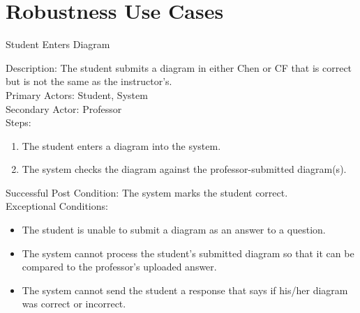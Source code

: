 \chapter{Robustness Use Cases}
    \begin{section}{Student Enters Diagram}
     
    Description: The student submits a diagram in either Chen or CF that is correct but is not the same as the instructor’s.\\
    Primary Actors: Student, System\\
    Secondary Actor: Professor\\
    Steps:
    \begin{enumerate}
    \item The student enters a diagram into the system.
    \item The system checks the diagram against the professor-submitted diagram(s).
    \end{enumerate}
    
     Successful Post Condition: 
    The system marks the student correct.\\
    Exceptional Conditions:
        \begin{itemize}
            \item The student is unable to submit a diagram as an answer to a question.
            \item The system cannot process the student’s submitted diagram so that it can be compared to the professor’s uploaded answer.
            \item The system cannot send the student a response that says if his/her diagram was correct or incorrect.
            \end{itemize}
    \end{section}
    
